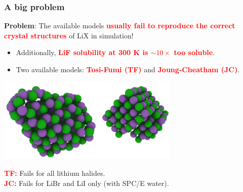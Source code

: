 \documentclass{beamer}
\newcommand{\insertcurrentcitation}{}
\newcommand{\currentcitation}[1]{
	\renewcommand{\insertcurrentcitation}{#1}
} %
\newcommand{\bb}[1]{\textcolor{red}{\textbf{#1}}}
\begin{document}
\currentcitation{\cite{Lanaro2017}}
\begin{frame}
\frametitle{A big problem}

\textbf{Problem}: The available models \bb{usually fail to reproduce the correct crystal structures} of LiX in simulation!
\begin{itemize}
	\item Additionally, \bb{LiF solubility at 300 K is $\sim 10\times$ too soluble}.
	\item Two available models: \bb{Tosi-Fumi (TF)} and \bb{Joung-Cheatham (JC)}.
\end{itemize}
\begin{center}
	\includegraphics[trim={0cm 0cm 0cm 0cm},clip,width=0.65\textwidth]{figures/Nucleated_Clusters.png}
\end{center}
\bb{TF:} Fails for all lithium halides.\\ \bb{JC:} Fails for LiBr and LiI only (with SPC/E water).
\end{frame}
\end{document}
